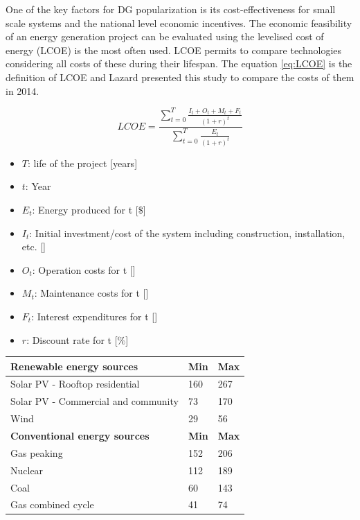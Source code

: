 One of the key factors for DG popularization is its cost-effectiveness for small scale systems and the national level economic incentives.
The economic feasibility of an energy generation project can be evaluated using the levelised cost of energy (LCOE) is the most often used. LCOE permits to compare technologies considering all costs of these during their lifespan. The equation \ref{eq:LCOE} is the definition of LCOE and Lazard \cite{Lazard2014} presented this study to compare the costs of them in 2014.

\begin{equation}
LCOE = \frac{\sum_{t=0}^{T} \frac{I_t+O_t+M_t+F_t}{(1+r)^t}}{\sum_{t=0}^{T} \frac{E_t}{(1+r)^t}}
\label{eq:LCOE}
\end{equation}

\begin{itemize}
	\item $T$: life of the project [years]
	\item $t$: Year
	\item $E_t$: Energy produced for t [$\$$]
	\item $I_t$: Initial investment/cost of the system including construction, installation, etc. [\textdollar]
	\item $O_t$: Operation costs for t [\textdollar]
	\item $M_t$: Maintenance costs for t [\textdollar]
	\item $F_t$: Interest expenditures for t [\textdollar]
	\item $r$: Discount rate for t [$\%$]
\end{itemize}

\begin{table}
	\centering
	\label{Unsubsidised levelised cost of energy comparison. Source: \cite{Lazard2018}}
	\begin{tabular}{lll}
		\textbf{Renewable energy sources} & \textbf{Min} & \textbf{Max} \\ \hline
		Solar PV - Rooftop residential & 160 & 267 \\
		Solar PV - Commercial and community & 73 & 170 \\
		Wind & 29 & 56 \\ \hline
		\textbf{Conventional energy sources} & \textbf{Min} & \textbf{Max} \\ \hline
		Gas peaking & 152 & 206 \\
		Nuclear & 112 & 189 \\
		Coal & 60 & 143 \\
		Gas combined cycle & 41 & 74 \\ \hline
	\end{tabular}
\end{table}

